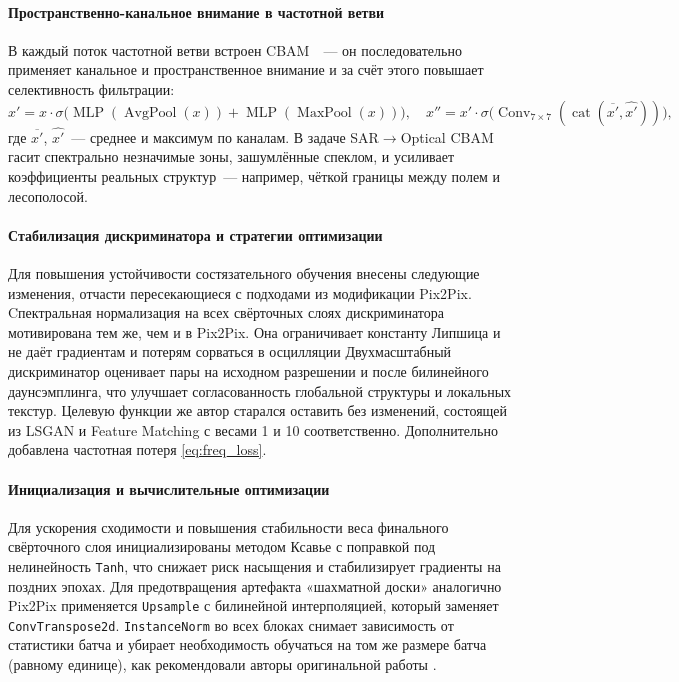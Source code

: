 \paragraph{Пространственно-канальное внимание в частотной ветви}
В каждый поток частотной ветви встроен CBAM~\cite{woo2018cbam}~--- он последовательно применяет канальное и пространственное внимание и за счёт этого повышает селективность фильтрации:
\begin{equation}
    x' = x \cdot \sigma\bigl( \operatorname{MLP}(\operatorname{AvgPool}(x)) + \operatorname{MLP}(\operatorname{MaxPool}(x)) \bigr), \quad
    x'' = x' \cdot \sigma\bigl( \operatorname{Conv}_{7\times7}(\operatorname{cat}(\overline{x'}, \widehat{x'})) \bigr),
\end{equation}
где $\overline{x'}$, $\widehat{x'}$~--- среднее и максимум по каналам. В задаче SAR$\to$Optical CBAM гасит спектрально незначимые зоны, зашумлённые спеклом, и усиливает коэффициенты реальных структур~--- например, чёткой границы между полем и лесополосой.

\paragraph{Стабилизация дискриминатора и стратегии оптимизации}
Для повышения устойчивости состязательного обучения внесены следующие изменения, отчасти пересекающиеся с подходами из модификации Pix2Pix.
Cпектральная нормализация на всех свёрточных слоях дискриминатора мотивирована тем же, чем и в Pix2Pix.
Она ограничивает константу Липшица и не даёт градиентам и потерям сорваться в осцилляции
Двухмасштабный дискриминатор оценивает пары на исходном разрешении и после билинейного даунсэмплинга, что улучшает согласованность глобальной структуры и локальных текстур.
Целевую функции же автор старался оставить без изменений, состоящей из LSGAN и Feature Matching с весами 1 и 10 соответственно.
Дополнительно добавлена частотная потеря \ref{eq:freq_loss}.

\paragraph{Инициализация и вычислительные оптимизации}
Для ускорения сходимости и повышения стабильности веса финального свёрточного слоя инициализированы методом Ксавье с поправкой под нелинейность \texttt{Tanh}, что снижает риск насыщения и стабилизирует градиенты на поздних эпохах.
Для предотвращения артефакта «шахматной доски» аналогично Pix2Pix применяется \texttt{Upsample} с билинейной интерполяцией, который заменяет \texttt{ConvTranspose2d}.
\texttt{InstanceNorm} во всех блоках снимает зависимость от статистики батча и убирает необходимость обучаться на том же размере батча (равному единице), как рекомендовали авторы оригинальной работы \cite{wei2023cfrwd}.

